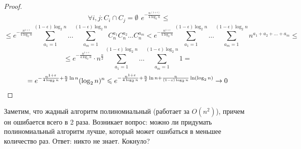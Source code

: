 \begin{proof}
\[{\begin{array}{l}
        \forall i, j: C_i \cap C_j = \emptyset
    \end{array}} e^{-\frac{n^{(1 + \epsilon)}}{4\log_2n}} \le\]
    \[ \le e^{-\frac{n^{1 + \epsilon}}{4\log_2n}}\sum_{a_1 = 1}^{(1 - \epsilon)\log_2n}\dots \sum_{a_m = 1}^{(1 - \epsilon)\log_2n}C_n^{a_1}C_n^{a_2}\dots C_n^{a_m} < e^{-\frac{n^{1 + \epsilon}}{4\log_2n}}\sum_{a_1 = 1}^{(1 - \epsilon)\log_2n}\dots \sum_{a_m = 1}^{(1 - \epsilon)\log_2n}n^{a_1 + a_2 + \dots + a_m} \le\]
    \[\le e^{-\frac{n^{1 + \epsilon}}{4\log_2n}}\cdot n^{\frac{n}{2}}\sum_{a_1 = 1}^{(1 - \epsilon)\log_2n}\dots \sum_{a_m = 1}^{(1 - \epsilon)\log_2n} 1 =\]
    \[= e^{-\frac{n^{1 + \varepsilon}}{4\log_2n} + \frac{n}{2}\ln n}(\log_2n)^n \leqslant e^{-\frac{n^{1 + \varepsilon}}{4\log_2n} + \frac{n}{2}\ln n + \frac{n}{(1 - \varepsilon)\log_2n}\ln(\log_2n)} \rightarrow 0\]
\end{proof}

Заметим, что жадный алгоритм полиномиальный (работает за \(O(n^2)\)), причем он ошибается всего в 2 раза. Возникает вопрос: можно ли придумать полиномиальный алгоритм лучше, который может ошибаться в меньшее количество раз. Ответ: никто не знает. Кокнуло?
